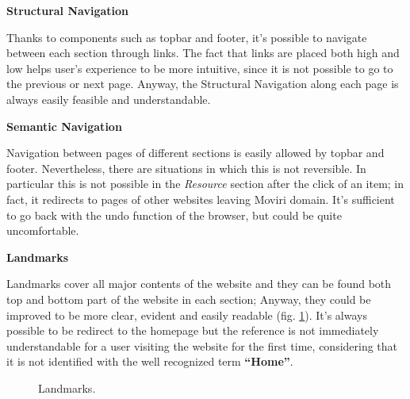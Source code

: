 \textbf{Structural Navigation}\par
Thanks to components such as topbar and footer, it's possible to navigate between each section through links. The fact that links are placed both high and low helps user’s experience to be more intuitive, since it is not possible to go to the previous or next page. Anyway, the Structural Navigation along each page is always easily feasible and understandable.
\medskip






\textbf{Semantic Navigation}\par
Navigation between pages of different sections is easily allowed by topbar and footer. Nevertheless, there are situations in which this is not reversible. In particular this is not possible in the \textit{Resource} section after the click of an item; in fact, it redirects to pages of other websites leaving Moviri domain. It's sufficient to go back with the undo function of the browser, but could be quite uncomfortable.
\medskip

\textbf{Landmarks}\par
Landmarks cover all major contents of the website and they can be found both top and bottom part of the website in each section; Anyway, they could be improved to be more clear, evident and easily readable (fig. \ref{landmarks}). It’s always possible to be redirect to the homepage but the reference is not immediately understandable for a user visiting the website for the first time, considering that it is not identified with the well recognized term \textbf{“Home”}.

\begin{figure}[H]
  \centering
        \caption{Landmarks.}
\label{landmarks}
\end{figure}

